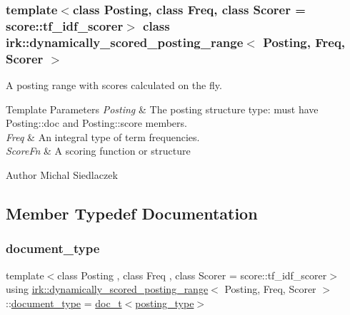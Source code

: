 \subsubsection*{template$<$class Posting, class Freq, class Scorer = score\+::tf\+\_\+idf\+\_\+scorer$>$\newline
class irk\+::dynamically\+\_\+scored\+\_\+posting\+\_\+range$<$ Posting, Freq, Scorer $>$}

A posting range with scores calculated on the fly. 


\begin{DoxyTemplParams}{Template Parameters}
{\em Posting} & The posting structure type\+: must have {\ttfamily Posting\+::doc} and {\ttfamily Posting\+::score} members. \\
\hline
{\em Freq} & An integral type of term frequencies. \\
\hline
{\em Score\+Fn} & A scoring function or structure\\
\hline
\end{DoxyTemplParams}
\begin{DoxyAuthor}{Author}
Michal Siedlaczek 
\end{DoxyAuthor}


\subsection{Member Typedef Documentation}
\mbox{\label{classirk_1_1dynamically__scored__posting__range_a30b30964cca4601be1eab249b12bd825}} 
\subsubsection{\texorpdfstring{document\+\_\+type}{document\_type}}
{\footnotesize\ttfamily template$<$class Posting , class Freq , class Scorer  = score\+::tf\+\_\+idf\+\_\+scorer$>$ \\
using \mbox{\hyperlink{classirk_1_1dynamically__scored__posting__range}{irk\+::dynamically\+\_\+scored\+\_\+posting\+\_\+range}}$<$ Posting, Freq, Scorer $>$\+::\mbox{\hyperlink{classirk_1_1dynamically__scored__posting__range_a30b30964cca4601be1eab249b12bd825}{document\+\_\+type}} =  \mbox{\hyperlink{namespaceirk_af5d95ec091f3bd711790e71ccb533903}{doc\+\_\+t}}$<$\mbox{\hyperlink{classirk_1_1dynamically__scored__posting__range_aac074648c23da33107bd6d03dae98ca5}{posting\+\_\+type}}$>$}

